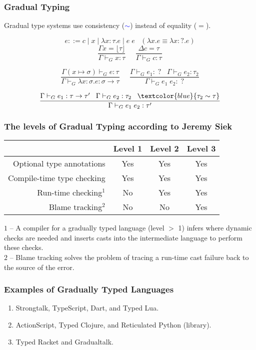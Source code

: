 \documentclass{beamer}
\begin{document}
\begin{frame}
\frametitle{Gradual Typing}
Gradual type systems use consistency (\textcolor{blue}{$\sim$}) instead of equality ($=$).
\begin{Large}
\[
e ::= c \;|\; x \;|\; \lambda x:\tau.e \;|\; e\;e \;\;\;
(\lambda x.e \equiv \lambda x:?.e)
\]
\[
\frac{\Gamma x = \lfloor\tau\rfloor}
     {\Gamma \vdash_{G} x:\tau} \;\;\;\;\;
\frac{\Delta c = \tau}
     {\Gamma \vdash_{G} c:\tau}
\]

\[
\frac{\Gamma(x \mapsto \sigma) \vdash_{G} e:\tau}
     {\Gamma \vdash_{G} \lambda x:\sigma.e:\sigma \rightarrow \tau} \;\;\;\;\;
\frac{\Gamma \vdash_{G} e_{1}:\;? \;\;\; \Gamma \vdash_{G} e_{2}:\tau_{2}}
     {\Gamma \vdash_{G} e_{1}\;e_{2}:\;?}
\]

\[
\frac{\Gamma \vdash_{G} e_{1}:\tau \rightarrow \tau' \;\;\;
      \Gamma \vdash_{G} e_{2}:\tau_{2} \;\;\; \textcolor{blue}{\tau_{2} \sim \tau}}
     {\Gamma \vdash_{G} e_{1}\;e_{2}:\tau'}
\]
\end{Large}
\end{frame}

\begin{frame}
\frametitle{The levels of Gradual Typing according to Jeremy Siek}
\begin{center}
\begin{tabular}{|r|c|c|c|}
\hline
& Level 1 & Level 2 & Level 3\\
\hline
Optional type annotations & Yes & Yes & Yes \\ 
\hline
Compile-time type checking & Yes & Yes & Yes \\
\hline
Run-time checking$^{1}$ & No & Yes & Yes \\
\hline
Blame tracking$^{2}$ & No & No & Yes\\
\hline
\end{tabular}
\end{center}
$1$ -- A compiler for a gradually typed language (level $>$ 1) infers
where dynamic checks are needed and inserts casts into the intermediate
language to perform these checks.\\
$2$ -- Blame tracking solves the problem of tracing a run-time cast
failure back to the source of the error.
\end{frame}

\begin{frame}
\frametitle{Examples of Gradually Typed Languages}
\begin{enumerate}
\item Strongtalk, TypeScript, Dart, and Typed Lua.
\item ActionScript, Typed Clojure, and Reticulated Python (library).
\item Typed Racket and Gradualtalk.
\end{enumerate}
\end{frame}
\end{document}
